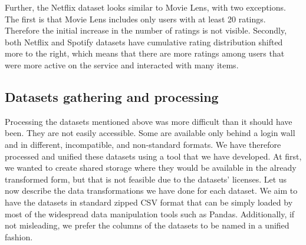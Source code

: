 Further, the Netflix dataset looks similar to Movie Lens, with two exceptions. The first is that Movie Lens includes only users with at least 20 ratings. Therefore the initial increase in the number of ratings is not visible. Secondly, both Netflix and Spotify datasets have cumulative rating distribution shifted more to the right, which means that there are more ratings among users that were more active on the service and interacted with many items.




\subsection{Datasets gathering and processing} \label{subsec:04_single_user_datasets.gathering_processing}

Processing the datasets mentioned above was more difficult than it should have been. They are not easily accessible. Some are available only behind a login wall and in different, incompatible, and non-standard formats. We have therefore processed and unified these datasets using a tool that we have developed. At first, we wanted to create shared storage where they would be available in the already transformed form, but that is not feasible due to the datasets' licenses. Let us now describe the data transformations we have done for each dataset. We aim to have the datasets in standard zipped CSV format that can be simply loaded by most of the widespread data manipulation tools such as Pandas. Additionally, if not misleading, we prefer the columns of the datasets to be named in a unified fashion.

